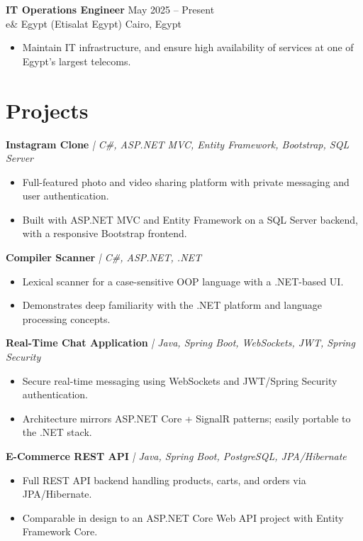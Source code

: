\documentclass[10pt, letterpaper]{article}
\newcommand{\cvproject}[2]{%
  \textbf{#1} \textit{| #2}%
}
\begin{document}
\textbf{IT Operations Engineer} \hfill May 2025 -- Present \\
e\& Egypt (Etisalat Egypt) \hfill Cairo, Egypt
\begin{itemize}
  \item Maintain IT infrastructure, and ensure high availability of services at one of Egypt's largest telecoms.
\end{itemize}

\section{Projects}

\cvproject{Instagram Clone}{C\#, ASP.NET MVC, Entity Framework, Bootstrap, SQL Server}
\begin{itemize}
  \item Full-featured photo and video sharing platform with private messaging and user authentication.
  \item Built with ASP.NET MVC and Entity Framework on a SQL Server backend, with a responsive Bootstrap frontend.
\end{itemize}

\cvproject{Compiler Scanner}{C\#, ASP.NET, .NET}
\begin{itemize}
  \item Lexical scanner for a case-sensitive OOP language with a .NET-based UI.
  \item Demonstrates deep familiarity with the .NET platform and language processing concepts.
\end{itemize}

\cvproject{Real-Time Chat Application}{Java, Spring Boot, WebSockets, JWT, Spring Security}
\begin{itemize}
  \item Secure real-time messaging using WebSockets and JWT/Spring Security authentication.
  \item Architecture mirrors ASP.NET Core + SignalR patterns; easily portable to the .NET stack.
\end{itemize}

\cvproject{E-Commerce REST API}{Java, Spring Boot, PostgreSQL, JPA/Hibernate}
\begin{itemize}
  \item Full REST API backend handling products, carts, and orders via JPA/Hibernate.
  \item Comparable in design to an ASP.NET Core Web API project with Entity Framework Core.
\end{itemize}
\end{document}
